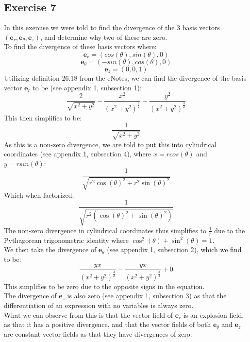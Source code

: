 \documentclass{article}
\begin{document}
\subsection{Exercise 7}
In this exercise we were told to find the divergence of the 3 basis vectors $(\mathbf{e}_r, \mathbf{e}_\theta,\mathbf{e}_z)$, and determine why two of these are zero. 
\\
To find the divergence of these basis vectors where:
\[\mathbf{e}_r = (cos(\theta), sin(\theta), 0)\]
\[\mathbf{e}_\theta = (-sin(\theta), cos(\theta), 0)\]
\[\mathbf{e}_z = (0,0,1)\]
Utilizing definition 26.18 from the eNotes, we can find the divergence of the basis vector $\mathbf{e}_r$ to be (see appendix 1, subsection 1):
\begin{equation}
  \frac{2}{\sqrt{x^{2}+y^{2}}}-\frac{x^{2}}{\left(x^{2}+y^{2}\right)^{\frac{3}{2}}}-\frac{y^{2}}{\left(x^{2}+y^{2}\right)^{\frac{3}{2}}}
\end{equation}
This then simplifies to be:
\begin{equation}
   \frac{1}{\sqrt{x^{2}+y^{2}}}
\end{equation}
As this is a non-zero divergence, we are told to put this into cylindrical coordinates (see appendix 1, subsection 4), where $x = rcos(\theta)$ and $y = rsin(\theta)$:
\begin{equation}
    \frac{1}{\sqrt{r^{2} \cos \left(\theta\right)^{2}+r^{2} \sin \left(\theta\right)^{2}}}
\end{equation}
Which when factorized:
\begin{equation}
    \frac{1}{\sqrt{r^{2} \left(\cos \left(\theta\right)^{2}+\sin \left(\theta\right)^{2}\right)}}
\end{equation}
The non-zero divergence in cylindrical coordinates thus simplifies to $\frac{1}{r}$ due to the Pythagorean trigonometric identity where $\cos^{2}\left(\theta\right)+\sin^{2}\left(\theta\right)=1$.
\\
We then take the divergence of $\mathbf{e}_\theta$ (see appendix 1, subsection 2), which we find to be:
\begin{equation}
    \frac{y x}{\left(x^{2}+y^{2}\right)^{\frac{3}{2}}}  -\frac{y x}{\left(x^{2}+y^{2}\right)^{\frac{3}{2}}} + 0
\end{equation}
This simplifies to be zero due to the opposite signs in the equation.
\\
The divergence of $\mathbf{e}_z$ is also zero (see appendix 1, subsection 3) as that the differentiation of an expression with no variables is always zero. 
\\
What we can observe from this is that the vector field of $\mathbf{e}_r$ is an explosion field, as that it has a positive divergence, and that the vector fields of both $\mathbf{e}_\theta$ and $\mathbf{e}_z$ are constant vector fields as that they have divergences of zero. 
\end{document}
